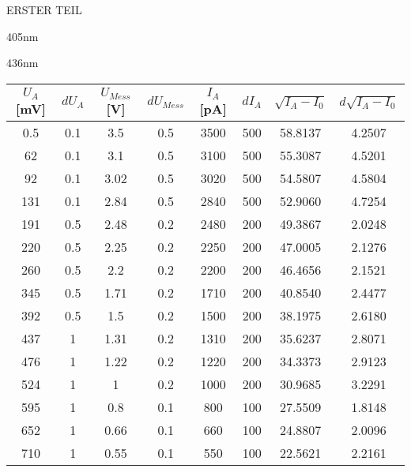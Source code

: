 \begin{appendix}
\begin{chapter}{ERSTER TEIL}
\begin{section}{405nm}
      \end{section}
      
     
     
      \newpage
      \begin{section}{436nm}
        \label{Anhang:chp:ERSTERTEIL:sec:436}
        
        \begin{table}[htbp]
          \centering
          \scriptsize
          \begin{tabular}{|c|c|c|c|c|c|c|c|}
            \hline
            $U_{A}$ [mV] & $dU_{A}$ & $U_{Mess}$ [V] & $dU_{Mess}$ & 
                $I_{A}$ [pA] & $dI_{A}$ & $\sqrt{I_{A}-I_0}$ & 
                $d\sqrt{I_{A}-I_0}$ \\ \hline
            0.5 & 0.1 & 3.5 & 0.5 & 3500 & 500 & 58.8137 & 4.2507 \\ \hline
            62 & 0.1 & 3.1 & 0.5 & 3100 & 500 & 55.3087 & 4.5201 \\ \hline
            92 & 0.1 & 3.02 & 0.5 & 3020 & 500 & 54.5807 & 4.5804 \\ \hline
            131 & 0.1 & 2.84 & 0.5 & 2840 & 500 & 52.9060 & 4.7254 \\ \hline
            191 & 0.5 & 2.48 & 0.2 & 2480 & 200 & 49.3867 & 2.0248 \\ \hline
            220 & 0.5 & 2.25 & 0.2 & 2250 & 200 & 47.0005 & 2.1276 \\ \hline
            260 & 0.5 & 2.2 & 0.2 & 2200 & 200 & 46.4656 & 2.1521 \\ \hline
            345 & 0.5 & 1.71 & 0.2 & 1710 & 200 & 40.8540 & 2.4477 \\ \hline
            392 & 0.5 & 1.5 & 0.2 & 1500 & 200 & 38.1975 & 2.6180 \\ \hline
            437 & 1 & 1.31 & 0.2 & 1310 & 200 & 35.6237 & 2.8071 \\ \hline
            476 & 1 & 1.22 & 0.2 & 1220 & 200 & 34.3373 & 2.9123 \\ \hline
            524 & 1 & 1 & 0.2 & 1000 & 200 & 30.9685 & 3.2291 \\ \hline
            595 & 1 & 0.8 & 0.1 & 800 & 100 & 27.5509 & 1.8148 \\ \hline
            652 & 1 & 0.66 & 0.1 & 660 & 100 & 24.8807 & 2.0096 \\ \hline
            710 & 1 & 0.55 & 0.1 & 550 & 100 & 22.5621 & 2.2161 \\ \hline

\end{tabular}
\end{table}
\end{section}
\end{chapter}
\end{appendix}
